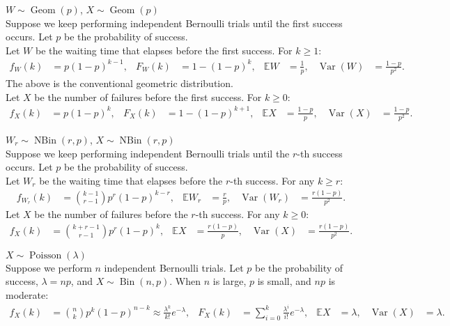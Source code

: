 \documentclass{huhtakm-template-book-v2}
\newcommand{\expect}{\mathbb{E}}
\DeclareMathOperator{\Bin}{Bin}
\DeclareMathOperator{\NBin}{NBin}
\DeclareMathOperator{\Geom}{Geom}
\DeclareMathOperator{\Poisson}{Poisson}
\DeclareMathOperator{\Var}{Var}
\begin{document}
    \begin{seg} $W \sim \Geom(p)$, $X \sim \Geom(p)$\\
        Suppose we keep performing independent Bernoulli trials until the first success occurs. Let $p$ be the probability of success.\\
        Let $W$ be the waiting time that elapses before the first success. For $k \geq 1$:
        \begin{align*}
            f_{W}(k) &= p(1-p)^{k-1}, & F_{W}(k) &= 1-(1-p)^{k}, & \expect{W} &= \frac{1}{p}, & \Var(W) &= \frac{1-p}{p^{2}}.
        \end{align*}
        The above is the conventional geometric distribution.\\
        Let $X$ be the number of failures before the first success. For $k \geq 0$:
        \begin{align*}
            f_{X}(k) &= p(1-p)^{k}, & F_{X}(k) &= 1-(1-p)^{k+1}, & \expect{X} &= \frac{1-p}{p}, & \Var(X) &= \frac{1-p}{p^{2}}.
        \end{align*}
    \end{seg}
    \begin{seg} $W_{r} \sim \NBin(r,p)$, $X \sim \NBin(r,p)$\\
        Suppose we keep performing independent Bernoulli trials until the $r$-th success occurs. Let $p$ be the probability of success.\\
        Let $W_{r}$ be the waiting time that elapses before the $r$-th success. For any $k \geq r$:
        \begin{align*}
            f_{W_{r}}(k) &= \binom{k-1}{r-1}p^{r}(1-p)^{k-r}, & \expect{W_{r}} &= \frac{r}{p}, & \Var(W_{r}) &= \frac{r(1-p)}{p^{2}}.
        \end{align*}
        Let $X$ be the number of failures before the $r$-th success. For any $k \geq 0$:
        \begin{align*}
            f_{X}(k) &= \binom{k+r-1}{r-1}p^{r}(1-p)^{k}, & \expect{X} &= \frac{r(1-p)}{p}, & \Var(X) &= \frac{r(1-p)}{p^{2}}.
        \end{align*}
    \end{seg}
    \begin{seg} $X \sim \Poisson(\lambda)$\\
        Suppose we perform $n$ independent Bernoulli trials. Let $p$ be the probability of success, $\lambda = np$, and $X \sim \Bin(n,p)$. When $n$ is large, $p$ is small, and $np$ is moderate:
        \begin{align*}
            f_{X}(k) &= \binom{n}{k}p^{k}(1-p)^{n-k} \approx \frac{\lambda^{k}}{k!}e^{-\lambda}, & F_{X}(k) &= \sum_{i = 0}^{k}\frac{\lambda^{i}}{i!}e^{-\lambda}, & \expect{X} &= \lambda, & \Var(X) &= \lambda.
        \end{align*}
    \end{seg}
    \newpage
\end{document}
